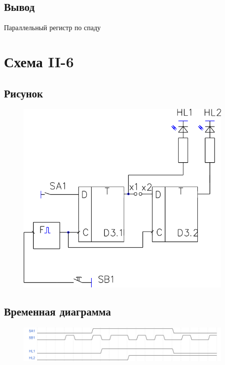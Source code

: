 \documentclass[a4paper]{article}
\begin{document}
\subsection{Вывод}
Параллельный регистр по спаду


\section{Схема II-6}

  

\subsection{Рисунок}
\begin{figure}[H]
    \centering
    \includegraphics[width=300pt]{s6.png}
\end{figure}

\subsection{Временная диаграмма}
\begin{figure}[H]
    \centering
    \includegraphics[width=300pt]{d6.png}
\end{figure}
\end{document}
